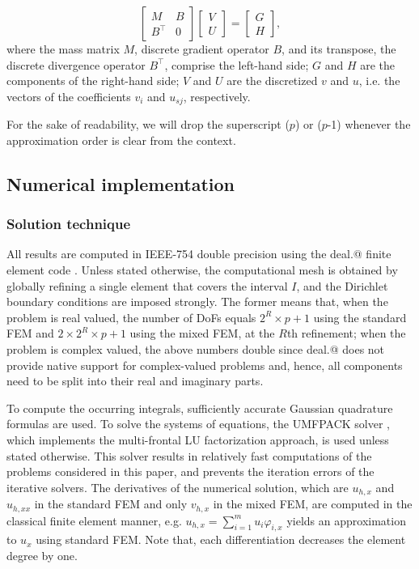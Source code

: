 \documentclass[review,3p]{elsarticle}
\makeatletter
\newcommand*{\rom}[1]{\expandafter\@slowromancap\romannumeral #1@}
\makeatother
\begin{document}
\begin{equation}
 \left[ \begin{array}{cc} M & B  \\ B^\top & 0 \end{array}\right] \left[ \begin{array}{cc} {V} \\ {U} \end{array}\right] =\left[ \begin{array}{cc} G \\ H \end{array}\right], \label{matrix equation mix FEM}
\end{equation}
where the mass matrix $M$, discrete gradient operator $B$, and its transpose, the discrete divergence operator $B^\top$, comprise the left-hand side; $G$ and $H$ are the components of the right-hand side; $V$ and $U$ are the discretized $v$ and $u$, i.e. the vectors of the coefficients $v_i$ and $u_{sj}$, respectively.

For the sake of readability, we will drop the superscript ($p$) or ($p$-1) whenever the approximation order is clear
from the context.

\subsection{Numerical implementation}

\subsubsection{Solution technique}

All results are computed in IEEE-754 double precision \cite{zuras2008ieee} using the deal.\rom{2} finite element code \cite{alzetta2018deal}. Unless stated otherwise, the computational mesh is obtained by globally refining a single element that covers the interval $I$, and the Dirichlet boundary conditions are imposed strongly. The former means that, when the problem is real valued, the number of DoFs equals $2^{R} \times p+1$ using the standard FEM and $2 \times 2^{R} \times p+1$ using the mixed FEM, at the $R$th refinement; when the problem is complex valued, the above numbers double since deal.\rom{2} does not provide native support for complex-valued problems and, hence, all components need to be split into their real and imaginary parts.

To compute the occurring integrals, sufficiently accurate Gaussian quadrature formulas are used. 
To solve the systems of equations, the UMFPACK solver \cite{davis2004algorithm}, which implements the multi-frontal LU factorization approach, is used unless stated otherwise. This solver results in relatively fast computations of the problems considered in this paper, and prevents the iteration errors of the iterative solvers. The derivatives of the numerical solution, which are $u_{h,x}$ and $u_{h,xx}$ in the standard FEM and only $v_{h,x}$ in the mixed FEM, are computed in the classical finite element manner, e.g. $u_{h,x}=\sum\limits _{i=1}^m u_i\varphi_{i,x}$ yields an approximation to $u_x$ using standard FEM. Note that, each differentiation decreases the element degree by one.
\end{document}
